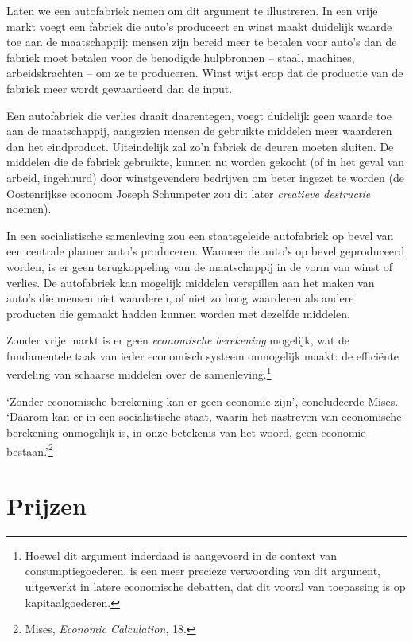 \documentclass[
  a5paper,
  smalldemyvopaper,11pt,twoside,onecolumn,openright,extrafontsizes,
hidelinks]{memoir}
\begin{document}
Laten we een autofabriek nemen om dit argument te illustreren. In een
vrije markt voegt een fabriek die auto's produceert en winst maakt
duidelijk waarde toe aan de maatschappij: mensen zijn bereid meer te
betalen voor auto's dan de fabriek moet betalen voor de benodigde
hulpbronnen -- staal, machines, arbeidskrachten -- om ze te produceren.
Winst wijst erop dat de productie van de fabriek meer wordt gewaardeerd
dan de input.

Een autofabriek die verlies draait daarentegen, voegt duidelijk geen
waarde toe aan de maatschappij, aangezien mensen de gebruikte middelen
meer waarderen dan het eindproduct. Uiteindelijk zal zo'n fabriek de
deuren moeten sluiten. De middelen die de fabriek gebruikte, kunnen nu
worden gekocht (of in het geval van arbeid, ingehuurd) door
winstgevendere bedrijven om beter ingezet te worden (de Oostenrijkse
econoom Joseph Schumpeter zou dit later \emph{creatieve destructie}
noemen).

In een socialistische samenleving zou een staatsgeleide autofabriek op
bevel van een centrale planner auto's produceren. Wanneer de auto's op
bevel geproduceerd worden, is er geen terugkoppeling van de maatschappij
in de vorm van winst of verlies. De autofabriek kan mogelijk middelen
verspillen aan het maken van auto's die mensen niet waarderen, of niet
zo hoog waarderen als andere producten die gemaakt hadden kunnen worden
met dezelfde middelen.

Zonder vrije markt is er geen \emph{economische berekening} mogelijk,
wat de fundamentele taak van ieder economisch systeem onmogelijk maakt:
de efficiënte verdeling van schaarse middelen over de
samenleving.\footnote{Hoewel dit argument inderdaad is aangevoerd in de
  context van consumptiegoederen, is een meer precieze verwoording van
  dit argument, uitgewerkt in latere economische debatten, dat dit
  vooral van toepassing is op kapitaalgoederen.}

`Zonder economische berekening kan er geen economie zijn', concludeerde
Mises. `Daarom kan er in een socialistische staat, waarin het nastreven
van economische berekening onmogelijk is, in onze betekenis van het
woord, geen economie bestaan.'\footnote{\hspace{0pt}Mises,
  \emph{Economic Calculation}, 18.}

\section{Prijzen}\label{prijzen}
\end{document}
